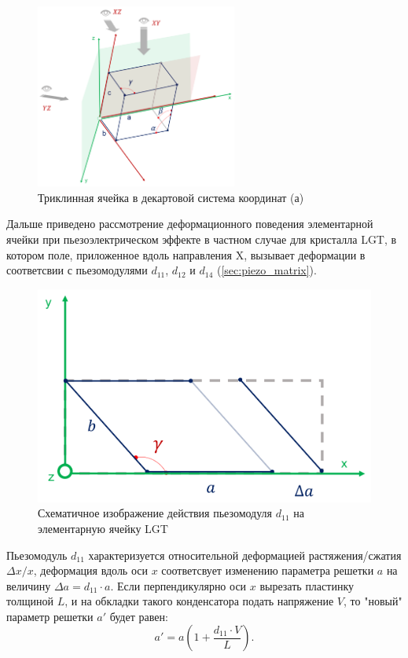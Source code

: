 \begin{figure}[H]
  \centering
  \includegraphics[width=0.59\textwidth]{images/piezo_deformation_general.png}
  \caption{Триклинная ячейка в декартовой система координат (а)}
  \label{ris:piezo_deformation_general}
\end{figure}


Дальше приведено рассмотрение деформационного поведения элементарной ячейки при пьезоэлектрическом
эффекте в частном случае для кристалла LGT, в котором поле, приложенное вдоль направления X,
вызывает деформации в соответсвии с пьезомодулями $d_{11}$, $d_{12}$ и $d_{14}$ (\ref{sec:piezo_matrix}).

\begin{figure}[H]
  \centering
  \includegraphics[width=.5\textwidth]{images/d11.png}
  \caption{Схематичное изображение действия пьезомодуля $d_{11}$ на элементарную ячейку LGT}
  \label{ris:d11}
\end{figure}

Пьезомодуль $d_{11}$ характеризуется относительной деформацией растяжения/сжатия $\Delta x/x$, деформация вдоль оси $x$
соответсвует изменению параметра решетки $a$ на величину $\Delta a = d_{11}\cdot a$. %
Если перпендикулярно оси $x$ вырезать пластинку толщиной $L$, и на обкладки такого конденсатора подать напряжение
$V$, то "новый" параметр решетки $a{'}$ будет равен:
\begin{equation}
   a{'}  = a \left(1+\frac{d_{11}\cdot V }{L}\right).
   \label{eq:a_deformed}
\end{equation}

